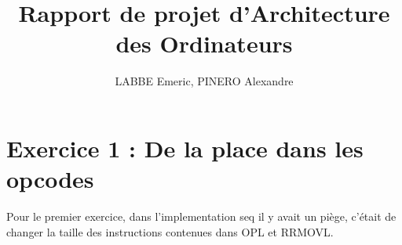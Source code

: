 \documentclass[12pt]{article}
\author{LABBE Emeric, PINERO Alexandre}
\title{Rapport de projet d'Architecture des Ordinateurs}
\begin{document}
\maketitle
\tableofcontents

\newpage
\section{Exercice 1 : De la place dans les opcodes}
Pour le premier exercice, dans l'implementation seq il y avait un piège, c'était de changer la taille des instructions contenues dans OPL et RRMOVL.
\end{document}

